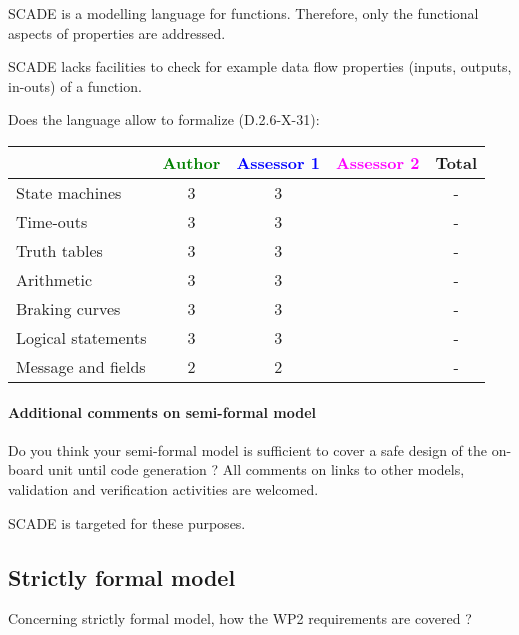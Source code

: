 \begin{author_comment}
SCADE is a modelling language for functions. Therefore, only the functional aspects of properties are addressed.  
\end{author_comment}


\begin{assessor1}
  SCADE lacks facilities to check for example data flow properties
  (inputs, outputs, in-outs) of a function.
\end{assessor1}


Does the language allow to  formalize (D.2.6-X-31):

\begin{tabular}{|l | c | c | c | c|}
\hline
& \textcolor{green}{Author} & \textcolor{blue}{Assessor 1} & \textcolor{magenta}{Assessor 2} & Total \\
\hline 
State machines  & 3 & 3 & & - \\
\hline
Time-outs  & 3 & 3 & & - \\
\hline
Truth tables  & 3 & 3 & & - \\
\hline
Arithmetic  & 3 & 3 & & - \\
\hline
Braking curves  & 3 & 3 & & - \\
\hline
Logical statements & 3 & 3 & & - \\
\hline
Message and fields & 2 & 2 & & - \\
\hline
\end{tabular}

\paragraph{Additional comments on semi-formal  model} Do you think your semi-formal  model is sufficient to cover a safe design of the on-board unit until code generation ?
All comments on links to  other models, validation and verification activities are welcomed.

\begin{author_comment}
SCADE is targeted for these purposes.   
\end{author_comment}


\subsection{Strictly formal model}

Concerning strictly formal model, how the WP2 requirements are covered ?

